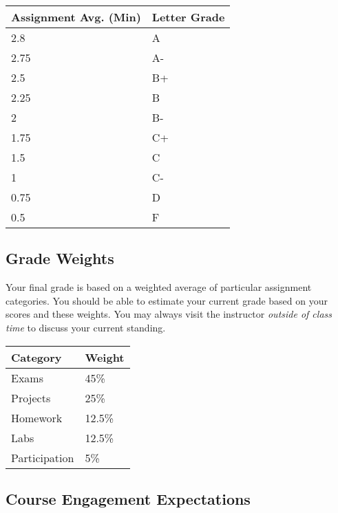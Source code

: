 \documentclass[nobib]{tufte-handout}
\begin{document}
\begin{center}
\begin{small}
\begin{tabular}{ll}
Assignment Avg. (Min) & Letter Grade \\ \toprule
2.8   & A  \\
2.75    & A- \\
2.5 & B+ \\
2.25    & B  \\
2   & B- \\
1.75    & C+ \\
1.5 & C  \\
1   & C- \\
0.75    & D  \\
0.5  & F
\end{tabular}
\end{small}
\end{center}

\subsection{Grade Weights}

Your final grade is based on a weighted average of particular assignment categories.  You should be able to estimate your current grade based on your scores and these weights.  You may always visit the instructor \textit{outside of class time} to discuss your current standing.

\begin{center}
  \begin{tabular}{ll}
  Category & Weight \\ \toprule
    Exams & 45\% \\ %
    Projects & 25\% \\ %
    Homework & 12.5\% \\ %
    Labs & 12.5\% \\ %
    Participation & 5\%
  \end{tabular}
\end{center}


\subsection{Course Engagement Expectations}
\end{document}
